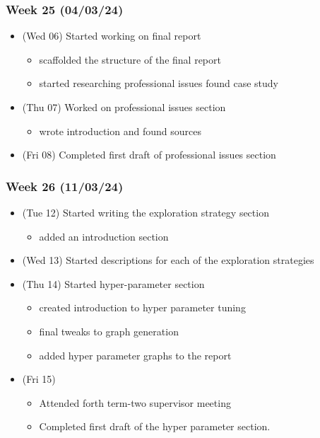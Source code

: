 \hypertarget{week-25-040324}{%
\subsubsection{Week 25 (04/03/24)}\label{week-25-040324}}

\begin{itemize}
\tightlist
\item
  (Wed 06) Started working on final report

  \begin{itemize}
  \tightlist
  \item
    scaffolded the structure of the final report
  \item
    started researching professional issues found case study
  \end{itemize}
\item
  (Thu 07) Worked on professional issues section

  \begin{itemize}
  \tightlist
  \item
    wrote introduction and found sources
  \end{itemize}
\item
  (Fri 08) Completed first draft of professional issues section
\end{itemize}

\hypertarget{week-26-110324}{%
\subsubsection{Week 26 (11/03/24)}\label{week-26-110324}}

\begin{itemize}
\tightlist
\item
  (Tue 12) Started writing the exploration strategy section

  \begin{itemize}
  \tightlist
  \item
    added an introduction section
  \end{itemize}
\item
  (Wed 13) Started descriptions for each of the exploration strategies
\item
  (Thu 14) Started hyper-parameter section

  \begin{itemize}
  \tightlist
  \item
    created introduction to hyper parameter tuning
  \item
    final tweaks to graph generation
  \item
    added hyper parameter graphs to the report
  \end{itemize}
\item
  (Fri 15)

  \begin{itemize}
  \tightlist
  \item
    Attended forth term-two supervisor meeting
  \item
    Completed first draft of the hyper parameter section.
  \end{itemize}
\end{itemize}

